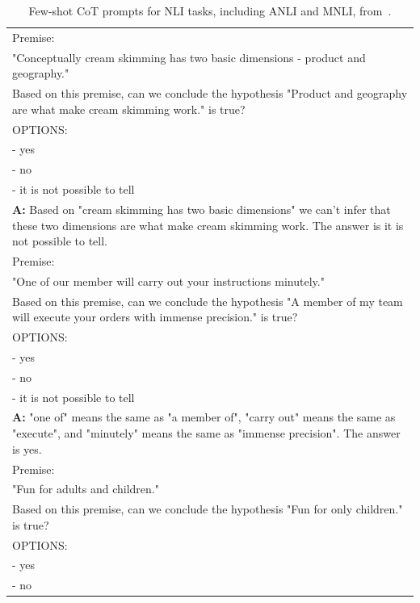 \documentclass{article} %
\begin{document}
\begin{table}[h]
    \caption{
    Few-shot CoT prompts for NLI tasks, including ANLI and MNLI, from~\cite{Wang2022RationaleAugmentedEI}.
    }
    \centering
    \small
    \begin{tabular}{p{14cm}}
        \toprule
        Premise:\\
        "Conceptually cream skimming has two basic dimensions - product and geography."\\
        Based on this premise, can we conclude the hypothesis "Product and geography are what make cream skimming work." is true?\\
        OPTIONS:\\
        - yes\\
        - no\\
        - it is not possible to tell\\
        \vspace{-1mm}
        \textbf{A:} Based on "cream skimming has two basic dimensions" we can't infer that these two dimensions are what make cream skimming work. The answer is it is not possible to tell.\\
        \vspace{0mm}
        Premise:\\
        "One of our member will carry out your instructions minutely."\\
        Based on this premise, can we conclude the hypothesis "A member of my team will execute your orders with immense precision." is true?\\
        OPTIONS:\\
        - yes\\
        - no\\
        - it is not possible to tell\\
        \vspace{-1mm}
        \textbf{A:} "one of" means the same as "a member of", "carry out" means the same as "execute", and "minutely" means the same as "immense precision". The answer is yes.\\
        \vspace{0mm}
        Premise:\\
        "Fun for adults and children."\\
        Based on this premise, can we conclude the hypothesis "Fun for only children." is true?\\
        OPTIONS:\\
        - yes\\
        - no\\

\end{tabular}
\end{table}
\end{document}
